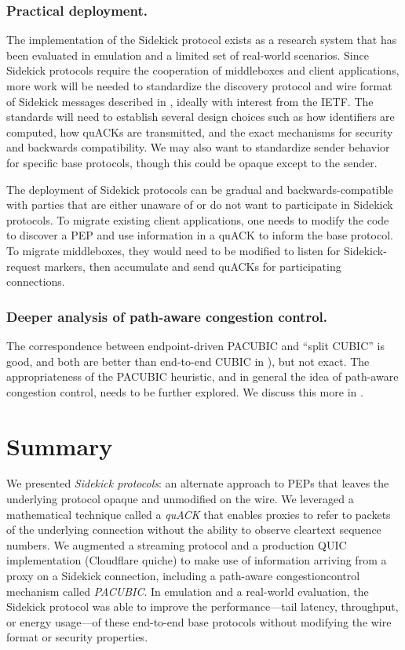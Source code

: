 \subsubsection{Practical deployment.}

The implementation of the Sidekick protocol exists as a research system that has
been evaluated in emulation and a limited set of real-world scenarios. Since
Sidekick protocols require the cooperation of middleboxes and client
applications, more work will be needed to standardize the discovery protocol
and wire format of Sidekick messages described in ,
ideally with interest from the IETF. The standards will need to establish
several design choices such as how identifiers are computed, how quACKs are
transmitted, and the exact mechanisms for security and backwards compatibility.
We may also want to standardize sender behavior for specific base protocols,
though this could be opaque except to the sender.

The deployment of Sidekick protocols can be gradual and backwards-compatible
with parties that are either unaware of or do not want to participate in Sidekick
protocols.
To migrate existing client applications, one needs to modify the code to
discover a PEP and use information in a quACK to inform the base protocol.
To migrate middleboxes, they would need to be modified to listen for
Sidekick-request markers, then accumulate and send quACKs for participating
connections.

\subsubsection{Deeper analysis of path-aware congestion control.}

The correspondence between endpoint-driven PACUBIC and ``split CUBIC'' is good,
and both are better than end-to-end CUBIC in ), but not
exact. The appropriateness of the PACUBIC heuristic, and in general the idea of
path-aware congestion control, needs to be further explored. We discuss this
more in .

\section{Summary}
\label{sec:sidekick:summary}

We presented \textit{Sidekick protocols}: an alternate approach to PEPs that
leaves the underlying protocol opaque and unmodified on the wire. We leveraged
a mathematical technique called a \textit{quACK} that enables proxies to refer
to packets of the underlying connection without the ability to observe
cleartext sequence numbers. We augmented a streaming protocol and a production
QUIC implementation (Cloudflare quiche) to make use of information arriving
from a proxy on a Sidekick connection, including a path-aware congestioncontrol
mechanism called \textit{PACUBIC}. In emulation and a real-world evaluation,
the Sidekick protocol was able to improve the performance---tail latency,
throughput, or energy usage---of these end-to-end base protocols without
modifying the wire format or security properties.
